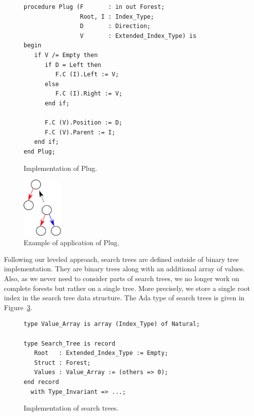 \documentclass[11pt,a4paper]{article}
\begin{document}
\begin{figure}[ht]
\begin{small}
\begin{lstlisting}
procedure Plug (F       : in out Forest;
                Root, I : Index_Type;
                D       : Direction;
                V       : Extended_Index_Type) is
begin
   if V /= Empty then
      if D = Left then
         F.C (I).Left := V;
      else
         F.C (I).Right := V;
      end if;

      F.C (V).Position := D;
      F.C (V).Parent := I;
   end if;
end Plug;
\end{lstlisting}
\end{small}
\caption{\label{fig-binary-body} Implementation of Plug.}
\end{figure}
\begin{figure}[ht]
\begin{center}
\includegraphics[width=2cm]{plug.pdf}
\caption{\label{fig-binary-body2} Example of application of Plug.}
\end{center}
\end{figure}

Following our leveled approach, search trees are defined outside of binary tree implementation.
They are binary trees along with an additional array of values. Also, as we never need to consider
parts of search trees, we no longer work on complete forests but rather on a single tree. More
precisely, we store a single root index in the search tree data structure.
The Ada type of search trees is given in Figure~\ref{fig-search-typ}.

\begin{figure}[ht]
\begin{small}
\begin{lstlisting}
type Value_Array is array (Index_Type) of Natural;

type Search_Tree is record
   Root   : Extended_Index_Type := Empty;
   Struct : Forest;
   Values : Value_Array := (others => 0);
end record
  with Type_Invariant => ...;
\end{lstlisting}
\end{small}
\caption{\label{fig-search-typ} Implementation of search trees.}
\end{figure}
\end{document}
